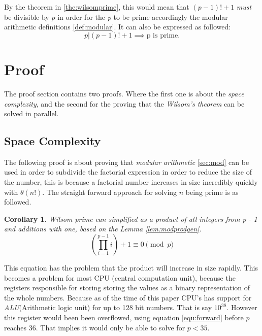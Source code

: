 \documentclass[12pt, oneside, onecolumn]{article}
\newtheorem{corollary}{Corollary}[theorem]
\begin{document}
By the theorem in \ref{the:wilsomprime}, this would mean that $(p-1)! + 1 $ \emph{must} be divisible by $p$ in order for the \emph{p} to be prime accordingly the modular arithmetic definitions \ref{def:modular}. It can also be expressed as followed:
\begin{equation}
p | (p - 1)! + 1 \implies \text{p is prime.}
\end{equation}

\section{Proof}\label{sec:proof}
The proof section contains two proofs. Where the first one is about the \emph{space complexity}, and the second for the proving that the \emph{Wilsom's theorem} can be solved in parallel.

\subsection{Space Complexity}\label{pro:spacecomplexity}
The following proof is about proving that \emph{modular arithmetic} \ref{sec:mod} can be used in order to subdivide the factorial expression in order to reduce the size of the number, this is because a factorial number increases in size incredibly quickly with $\theta(n!)$. The straight forward approach for solving $n$ being prime is as followed.

\begin{corollary}{}
Wilsom prime can simplified as a product of all integers from p - 1 and additions with one, based on the Lemma \ref{lem:modprodgen}.
\begin{equation}\label{equ:forward}
 \left( \prod_{i = 1}^{p-1} i \right) + 1 \equiv 0 \pmod p
\end{equation}

\end{corollary}


This equation has the problem that the product will increase in size rapidly. This becomes a problem for most CPU (central computation unit), because the registers responsible for storing storing the values as a binary representation of the whole numbers. Because as of the time of this paper CPU's has support for \emph{ALU}(Arithmetic logic unit) for up to 128 bit numbers. That is say $10^{38}$. However this register would been been overflowed, using equation \ref{equ:forward} before $p$ reaches $36$. That implies it would only be able to solve for $p < 35$.
\end{document}
